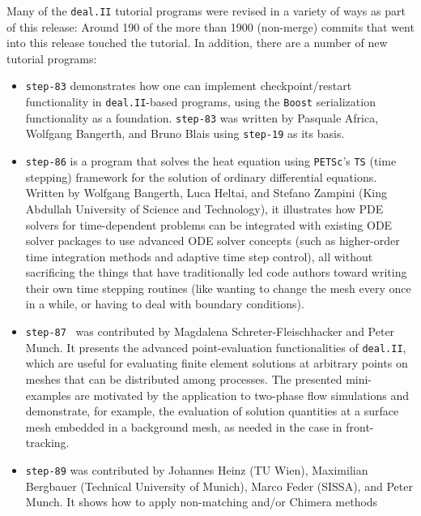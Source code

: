 \documentclass{ansarticle-preprint}
\newcommand{\specialword}[1]{\texttt{#1}}
\newcommand{\dealii}{{\specialword{deal.II}}\xspace}
\newcommand{\petsc}{\specialword{PETSc}\xspace}
\newcommand{\ts}{{\specialword{TS}}\xspace}
\newcommand{\boost}{{\specialword{Boost}}\xspace}
\newcommand{\step}[1]{{\specialword{step-#1}}\xspace}
\begin{document}
Many of the \dealii tutorial programs were revised in a variety of ways
as part of this release: Around 190 of the more than 1900 (non-merge)
commits that went into this release touched the tutorial.
In addition, there are a number of new tutorial
programs:
\begin{itemize}
  \item
    \step{83}
    demonstrates how one can implement
    checkpoint/restart functionality in \dealii-based programs,
    using the \boost{} serialization functionality as a
    foundation. \step{83} was written by Pasquale Africa, Wolfgang
    Bangerth, and Bruno Blais using \step{19} as its basis.
  \item
    \step{86}
    is a program that solves the heat equation using \petsc's \ts{} (time
    stepping) framework for the solution of ordinary differential
    equations. Written by Wolfgang Bangerth, Luca Heltai, and Stefano Zampini
    (King Abdullah University of Science and Technology), it
    illustrates how PDE solvers for time-dependent problems can be
    integrated with existing ODE solver packages to use advanced ODE
    solver concepts (such as higher-order time integration methods and
    adaptive time step control), all without sacrificing the things
    that have traditionally led code authors toward writing their own
    time stepping routines (like wanting to change the mesh every
    once in a while, or having to deal with boundary conditions).
  \item
    \step{87}~\cite{schreter2023step87} was contributed by Magdalena Schreter-Fleischhacker
    and Peter Munch. It
    presents the advanced point-evaluation functionalities of \dealii,
    which are useful for evaluating finite element solutions at
    arbitrary points on meshes that can be distributed among
    processes. The presented mini-examples are motivated by the
    application to two-phase flow simulations and demonstrate, for
    example, the evaluation of solution quantities at a surface mesh
    embedded in a background mesh, as needed in the case in front-tracking.
  \item
    \step{89} was contributed by Johannes Heinz (TU Wien),
    Maximilian Bergbauer (Technical University of Munich),
    Marco Feder (SISSA), and Peter Munch.
    It shows how to apply non-matching and/or Chimera methods

\end{itemize}
\end{document}
